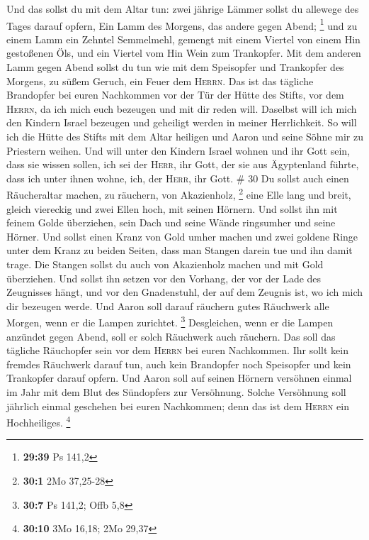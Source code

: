  Und das sollst du mit dem Altar tun: zwei jährige Lämmer
sollst du allewege des Tages darauf opfern,  Ein Lamm des
Morgens, das andere gegen Abend; \footnote{\textbf{29:39} Ps 141,2}
 und zu einem Lamm ein Zehntel Semmelmehl, gemengt mit
einem Viertel von einem Hin gestoßenen Öls, und ein Viertel vom Hin Wein
zum Trankopfer.  Mit dem anderen Lamm gegen Abend sollst
du tun wie mit dem Speisopfer und Trankopfer des Morgens, zu süßem
Geruch, ein Feuer dem \textsc{Herrn}.  Das ist das
tägliche Brandopfer bei euren Nachkommen vor der Tür der Hütte des
Stifts, vor dem \textsc{Herrn}, da ich mich euch bezeugen und mit dir
reden will.  Daselbst will ich mich den Kindern Israel
bezeugen und geheiligt werden in meiner Herrlichkeit.  So
will ich die Hütte des Stifts mit dem Altar heiligen und Aaron und seine
Söhne mir zu Priestern weihen.  Und will unter den
Kindern Israel wohnen und ihr Gott sein,  dass sie wissen
sollen, ich sei der \textsc{Herr}, ihr Gott, der sie aus Ägyptenland
führte, dass ich unter ihnen wohne, ich, der \textsc{Herr}, ihr Gott. \#
30  Du sollst auch einen Räucheraltar machen, zu räuchern,
von Akazienholz, \footnote{\textbf{30:1} 2Mo 37,25-28} 
eine Elle lang und breit, gleich viereckig und zwei Ellen hoch, mit
seinen Hörnern.  Und sollst ihn mit feinem Golde
überziehen, sein Dach und seine Wände ringsumher und seine Hörner. Und
sollst einen Kranz von Gold umher machen  und zwei goldene
Ringe unter dem Kranz zu beiden Seiten, dass man Stangen darein tue und
ihn damit trage.  Die Stangen sollst du auch von
Akazienholz machen und mit Gold überziehen.  Und sollst
ihn setzen vor den Vorhang, der vor der Lade des Zeugnisses hängt, und
vor den Gnadenstuhl, der auf dem Zeugnis ist, wo ich mich dir bezeugen
werde.  Und Aaron soll darauf räuchern gutes Räuchwerk
alle Morgen, wenn er die Lampen zurichtet. \footnote{\textbf{30:7} Ps
  141,2; Offb 5,8}  Desgleichen, wenn er die Lampen
anzündet gegen Abend, soll er solch Räuchwerk auch räuchern. Das soll
das tägliche Räuchopfer sein vor dem \textsc{Herrn} bei euren
Nachkommen.  Ihr sollt kein fremdes Räuchwerk darauf tun,
auch kein Brandopfer noch Speisopfer und kein Trankopfer darauf opfern.
 Und Aaron soll auf seinen Hörnern versöhnen einmal im
Jahr mit dem Blut des Sündopfers zur Versöhnung. Solche Versöhnung soll
jährlich einmal geschehen bei euren Nachkommen; denn das ist dem
\textsc{Herrn} ein Hochheiliges. \footnote{\textbf{30:10} 3Mo 16,18; 2Mo
  29,37}

